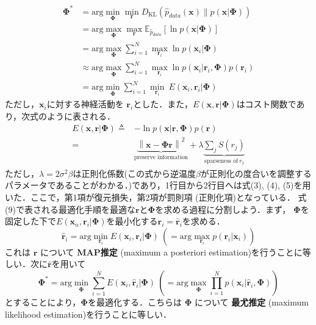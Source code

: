 \begin{align}
\mathbf{\Phi}^*&=\text{arg} \min_{\mathbf{\Phi}} \min_{\mathbf{r}} D_{\text{KL}}\left(\hat{p}_{data}(\mathbf{x}) \| p(\mathbf{x}|\mathbf{\Phi})\right)\\
&=\text{arg} \max_{\mathbf{\Phi}} \max_{\mathbf{r}} \mathbb{E}_{\hat{p}_{data}} \left[\ln p(\mathbf{x}|\mathbf{\Phi})\right]\\
&= \text{arg} \max_{\mathbf{\Phi}}\sum_{i=1}^N \max_{\mathbf{r}_i} \ln p(\mathbf{x}_i|\mathbf{\Phi})\\
&\approx \text{arg} \max_{\mathbf{\Phi}}\sum_{i=1}^N \max_{\mathbf{r}_i} \ln p(\mathbf{x}_i|\mathbf{r}_i, \mathbf{\Phi})p(\mathbf{r}_i)\\
&=\text{arg}\min_{\mathbf{\Phi}} \sum_{i=1}^N \min_{\mathbf{r}_i}\ E(\mathbf{x}_i, \mathbf{r}_i|\mathbf{\Phi})
\end{align}
ただし，$\mathbf{x}_i$に対する神経活動を $\mathbf{r}_i$とした．また，$E(\mathbf{x}, \mathbf{r}|\mathbf{\Phi})$はコスト関数であり，次式のように表される．
\begin{align}
E(\mathbf{x}, \mathbf{r}|\mathbf{\Phi})\triangleq&-\ln p(\mathbf{x}|\mathbf{r}, \mathbf{\Phi})p(\mathbf{r})\\
=&\underbrace{\left\|\mathbf{x}-\mathbf{\Phi} \mathbf{r}\right\|^2}_{\text{preserve information}} + \lambda \underbrace{\sum_j S\left(r_j\right)}_{\text{sparseness of}\ r_j}
\end{align}
ただし，$\lambda=2\sigma^2\beta$は正則化係数(この式から逆温度$\beta$が正則化の度合いを調整するパラメータであることがわかる．)であり，1行目から2行目へは式(3), (4), (5)を用いた．ここで，第1項が復元損失，第2項が罰則項 (正則化項)となっている．
式(9)で表される最適化手順を最適な$\mathbf{r}$と$\mathbf{\Phi}$を求める過程に分割しよう．まず， $\mathbf{\Phi}$を固定した下で$E(\mathbf{x}_n, \mathbf{r}_i|\mathbf{\Phi})$を最小化する$\mathbf{r}_i=\hat{\mathbf{r}}_i$を求める．
\begin{equation}
\hat{\mathbf{r}}_i=\text{arg}\min_{\mathbf{r}_i}E(\mathbf{x}_i, \mathbf{r}_i|\mathbf{\Phi})\ \left(= \text{arg}\max_{\mathbf{r}_i}p(\mathbf{r}_i|\mathbf{x}_i)\right)
\end{equation}
これは $\mathbf{r}$ について \textbf{MAP推定} (maximum a posteriori estimation)を行うことに等しい．次に$\hat{\mathbf{r}}$を用いて
\begin{equation}
\mathbf{\Phi}^*=\text{arg}\min_{\mathbf{\Phi}} \sum_{i=1}^N E(\mathbf{x}_i, \hat{\mathbf{r}}_i|\mathbf{\Phi})\ \left(= \text{arg}\max_{\mathbf{\Phi}} \prod_{i=1}^N p(\mathbf{x}_i|\hat{\mathbf{r}}_i, \mathbf{\Phi})\right)
\end{equation}
とすることにより，$\mathbf{\Phi}$を最適化する．こちらは $\mathbf{\Phi}$ について \textbf{最尤推定} (maximum likelihood estimation)を行うことに等しい．
